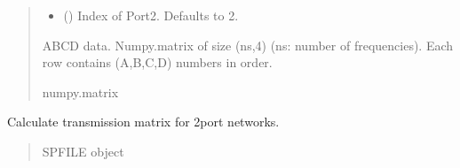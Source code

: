 \documentclass[letterpaper,10pt,english]{sphinxmanual}
\begin{document}
\begin{fulllineitems}
\begin{fulllineitems}
\begin{quote}
\begin{description}
\begin{itemize}
\item {} 
\sphinxAtStartPar
{} (\sphinxstyleliteralemphasis{\sphinxupquote{, }}) \textendash{} Index of Port\sphinxhyphen{}2. Defaults to 2.

\end{itemize}

\sphinxAtStartPar
ABCD data. Numpy.matrix of size (ns,4) (ns: number of frequencies). Each row contains (A,B,C,D) numbers in order.

\sphinxAtStartPar
numpy.matrix

\end{description}\end{quote}

\end{fulllineitems}


\begin{fulllineitems}
\label{\detokenize{touchstone:touchstone.spfile.s2t}}
\pysigstartsignatures
{}
\pysigstopsignatures
\sphinxAtStartPar
Calculate transmission matrix for 2\sphinxhyphen{}port networks.
\begin{quote}\begin{description}
\sphinxAtStartPar
SPFILE object

\sphinxAtStartPar
{\hyperref[\detokenize{touchstone:touchstone.spfile}]{}}

\end{description}\end{quote}

\end{fulllineitems}


\begin{fulllineitems}
\label{\detokenize{touchstone:touchstone.spfile.scaledata}}
\pysigstartsignatures
{}
\pysigstopsignatures
\end{fulllineitems}


\end{fulllineitems}
\end{document}
